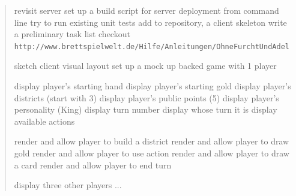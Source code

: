 \documentclass[10pt,a4paper]{article}
\begin{document}
\begin{quote}

\tdos
\tdo revisit server
\tdo set up a build script for server deployment from command line
\tdo try to run existing unit tests
\tdo add to repository, a client skeleton
\tod write a preliminary task list
\tdo checkout \\
\verb|http://www.brettspielwelt.de/Hilfe/Anleitungen/OhneFurchtUndAdel|

\vspace{1em}
\tdo sketch client visual layout
\tdo set up a mock up backed game with 1 player

\vspace{1em}
\tdo display player's starting hand
\tdo display player's starting gold
\tdo display player's districts (start with 3)
\tdo display player's public points (5)
\tdo display player's personality (King)
\tdo display turn number
\tdo display whose turn it is
\tdo display available actions

\vspace{1em}
\tdo render and allow player to build a district
\tdo render and allow player to draw gold
\tdo render and allow  player to use action
\tdo render and allow  player to draw a card
\tdo render and allow  player to end turn

\vspace{1em}
\tdo display three other players ...
\tdoe

\vspace{2em}
\end{quote}
\end{document}
